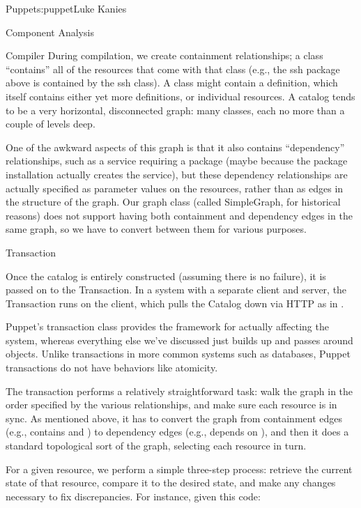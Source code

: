 \begin{aosachapter}{Puppet}{s:puppet}{Luke Kanies}
\begin{aosasect1}{Component Analysis}
\begin{aosasect2}{Compiler}
During compilation, we create containment relationships; a class
``contains'' all of the resources that come with that class (e.g., the
ssh package above is contained by the ssh class).  A class
might contain a definition, which itself contains either yet more
definitions, or individual resources.  A catalog tends to be a very
horizontal, disconnected graph: many classes, each no more than a
couple of levels deep.

One of the awkward aspects of this graph is that it also contains
``dependency'' relationships, such as a service requiring a package
(maybe because the package installation actually creates the service),
but these dependency relationships are actually specified as parameter
values on the resources, rather than as edges in the structure of the
graph.  Our graph class (called SimpleGraph, for historical reasons)
does not support having both containment and dependency edges in the
same graph, so we have to convert between them for various purposes.

\end{aosasect2}

\begin{aosasect2}{Transaction}

Once the catalog is entirely constructed (assuming there is no
failure), it is passed on to the Transaction.  In a system with a
separate client and server, the Transaction runs on the client, which pulls the Catalog down via HTTP as in .

Puppet's transaction class provides the framework for actually
affecting the system, whereas everything else we've discussed just
builds up and passes around objects.  Unlike transactions in more
common systems such as databases, Puppet transactions do not have
behaviors like atomicity.

The transaction performs a relatively straightforward task: walk the
graph in the order specified by the various relationships, and make
sure each resource is in sync.  As mentioned above, it has to convert
the graph from containment edges (e.g.,  contains
 and ) to dependency edges (e.g.,
 depends on ), and then it does a standard
topological sort of the graph, selecting each resource in turn.

For a given resource, we perform a simple three-step process: retrieve
the current state of that resource, compare it to the desired state,
and make any changes necessary to fix discrepancies.  For
instance, given this code:


\end{aosasect2}
\end{aosasect1}
\end{aosachapter}
